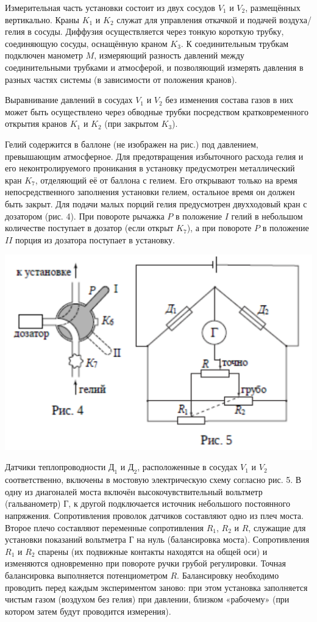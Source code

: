 \documentclass[a4paper,11.5pt]{article} %
\begin{document}
Измерительная часть установки состоит из двух сосудов $V_1$ и $V_2$, размещённых вертикально. Краны $K_1$ и $K_2$ служат для управления откачкой и подачей воздуха/гелия в сосуды. Диффузия осуществляется через тонкую короткую трубку, соединяющую сосуды, оснащённую краном $K_3$. К соединительным трубкам подключен манометр $M$, измеряющий разность давлений между соединительными трубками и атмосферой, и позволяющий измерять давления в разных частях системы (в зависимости от положения кранов).

Выравнивание давлений в сосудах $V_1$ и $V_2$ без изменения состава газов в них может быть осуществлено через обводные трубки посредством кратковременного открытия кранов $K_1$ и $K_2$ (при закрытом $K_3$).

Гелий содержится в баллоне (не изображен на рис.) под давлением, превышающим атмосферное. Для предотвращения избыточного расхода гелия и его неконтролируемого проникания в установку предусмотрен металлический кран $K_7$, отделяющий её от баллона с гелием. Его открывают только на время непосредственного заполнения установки гелием, остальное время он должен быть закрыт. Для подачи малых порций гелия предусмотрен двухходовый кран с дозатором (рис. 4). При повороте рычажка $P$ в положение $I$ гелий в небольшом количестве поступает в дозатор (если открыт $K_7$), а при повороте $P$ в положение $II$ порция из дозатора поступает в установку.
\begin{center}
    \includegraphics[scale = 1.0]{2213.png}
\end{center}
Датчики теплопроводности $\text{Д}_1$ и $\text{Д}_2$, расположенные в сосудах $V_1$ и $V_2$ соответственно, включены в мостовую электрическую схему согласно рис. 5. В одну из диагоналей моста включён высокочувствительный вольтметр (гальванометр) Г, к другой подключается источник небольшого постоянного напряжения. Сопротивления проволок датчиков составляют одно из плеч моста. Второе плечо составляют переменные сопротивления $R_1$, $R_2$ и $R$, служащие для установки показаний вольтметра Г на нуль (балансировка моста). Сопротивления $R_1$ и $R_2$ спарены (их подвижные контакты находятся на общей оси) и изменяются одновременно при повороте ручки грубой регулировки. Точная балансировка выполняется потенциометром $R$. Балансировку необходимо проводить перед каждым экспериментом заново: при этом установка заполняется чистым газом (воздухом без гелия) при давлении, близком «рабочему» (при котором затем будут проводится измерения).
\end{document}
